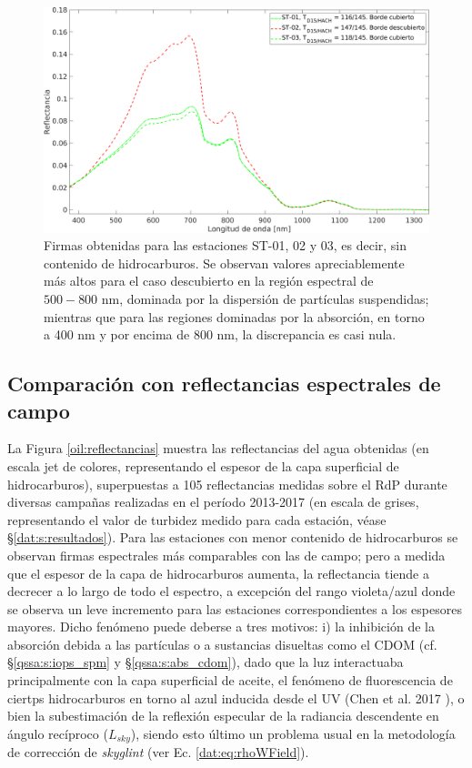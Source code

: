         \begin{figure}
            \centering
            \includegraphics[width=\textwidth]{oil/figures/borde}
            \caption[Firmas obtenidas para las estaciones sin contenido de hidrocarburos.]{Firmas obtenidas para las estaciones ST-01, 02 y 03, es decir, sin contenido de hidrocarburos. Se observan valores apreciablemente más altos para el caso descubierto en la región espectral de $500-800$ nm, dominada por la dispersión de partículas suspendidas; mientras que para las regiones dominadas por la absorción, en torno a 400 nm y por encima de 800 nm, la discrepancia es casi nula.}
            \label{oil:borde}
        \end{figure}

    \subsection{Comparación con reflectancias espectrales de campo}
    \label{oil:s:campo}
        La Figura \ref{oil:reflectancias} muestra las reflectancias del agua obtenidas (en escala jet de colores, representando el espesor de la capa superficial de hidrocarburos), superpuestas a 105 reflectancias medidas sobre el RdP durante diversas campañas realizadas en el período 2013-2017 (en escala de grises, representando el valor de turbidez medido para cada estación, véase \S \ref{dat:s:resultados}). Para las estaciones con menor contenido de hidrocarburos se observan firmas espectrales más comparables con las de campo; pero a medida que el espesor de la capa de hidrocarburos aumenta, la reflectancia tiende a decrecer a lo largo de todo el espectro, a excepción del rango violeta/azul donde se observa un leve incremento para las estaciones correspondientes a los espesores mayores. Dicho fenómeno puede deberse a tres motivos: i)  la inhibición de la absorción debida a las partículas o a sustancias disueltas como el CDOM (cf. \S \ref{qssa:s:iops_spm} y \S \ref{qssa:s:abs_cdom}), dado que la luz interactuaba principalmente con la capa superficial de aceite, el fenómeno de fluorescencia de ciertps hidrocarburos en torno al azul inducida desde el UV (Chen et al. 2017 \cite{chen2017}), o bien la subestimación de la reflexión especular de la radiancia descendente en ángulo recíproco ($L_{sky}$), siendo esto último un problema usual en la metodología de corrección de \textit{skyglint} (ver Ec. \ref{dat:eq:rhoWField}).
        
